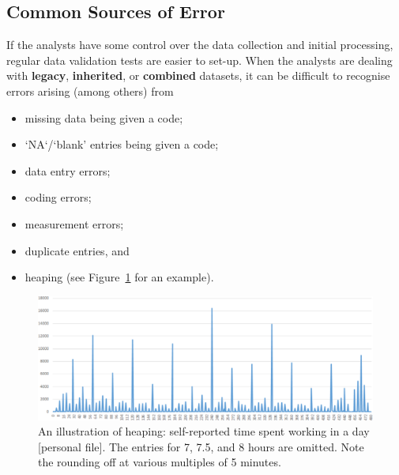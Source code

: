 \subsection{Common Sources of Error}
If the analysts have some control over the data collection and initial processing, regular data validation tests are easier to set-up. \newl When the analysts are dealing with \textbf{legacy}, \textbf{inherited}, or \textbf{combined} datasets, it can be difficult to recognise errors arising (among others) from \begin{itemize}[noitemsep] \item missing data being given a code; \item `NA`/`blank' entries being given a code; \item data entry errors;\item coding errors;\item measurement errors;\item duplicate entries, and \item heaping (see Figure~\ref{fig:heaping} for an example).\end{itemize} 
\begin{figure}[t]
\centering
\includegraphics[width=\textwidth]{Images/heaping.png}
\caption[\small An illustration of heaping]{\small An illustration of heaping: self-reported time spent working in a day [personal file]. The entries for 7, 7.5, and 8 hours are omitted. Note the rounding off at various multiples of 5 minutes.}  \label{fig:heaping}
\end{figure}
